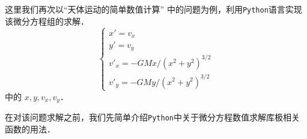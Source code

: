 这里我们再次以“天体运动的简单数值计算” 中的问题为例，利用\verb |Python|语言实现该微分方程组的求解．
\begin{equation}\label{PyIVP_eq}
\begin{cases}
x' = v_x\\
y' = v_y\\
v'_x = -GMx/(x^2 + y^2)^{3/2}\\
v'_y = -GMy/(x^2 + y^2)^{3/2}
\end{cases}
\end{equation}
中的 $x, y, v_x, v_y$．

在对该问题求解之前，我们先简单介绍\verb|Python|中关于微分方程数值求解库极相关函数的用法．